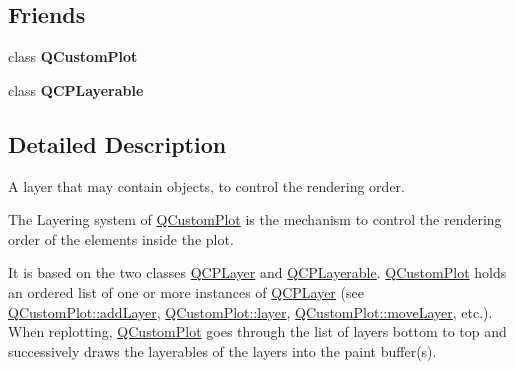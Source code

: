 \subsection*{Friends}
\begin{DoxyCompactItemize}
\item 
\mbox{\label{classQCPLayer_a1cdf9df76adcfae45261690aa0ca2198}} 
class {\bfseries Q\+Custom\+Plot}
\item 
\mbox{\label{classQCPLayer_ad655f55cccf49ba14d5172ec517e07ae}} 
class {\bfseries Q\+C\+P\+Layerable}
\end{DoxyCompactItemize}


\subsection{Detailed Description}
A layer that may contain objects, to control the rendering order. 

The Layering system of \hyperlink{classQCustomPlot}{Q\+Custom\+Plot} is the mechanism to control the rendering order of the elements inside the plot.

It is based on the two classes \hyperlink{classQCPLayer}{Q\+C\+P\+Layer} and \hyperlink{classQCPLayerable}{Q\+C\+P\+Layerable}. \hyperlink{classQCustomPlot}{Q\+Custom\+Plot} holds an ordered list of one or more instances of \hyperlink{classQCPLayer}{Q\+C\+P\+Layer} (see \hyperlink{classQCustomPlot_ad5255393df078448bb6ac83fa5db5f52}{Q\+Custom\+Plot\+::add\+Layer}, \hyperlink{classQCustomPlot_a0a96244e7773b242ef23c32b7bdfb159}{Q\+Custom\+Plot\+::layer}, \hyperlink{classQCustomPlot_ae896140beff19424e9e9e02d6e331104}{Q\+Custom\+Plot\+::move\+Layer}, etc.). When replotting, \hyperlink{classQCustomPlot}{Q\+Custom\+Plot} goes through the list of layers bottom to top and successively draws the layerables of the layers into the paint buffer(s).

